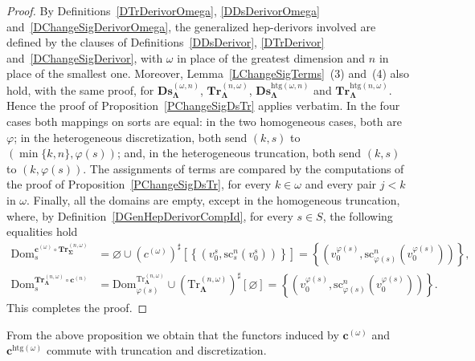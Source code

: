 \documentclass[a4paper, reqno]{amsbook}
\newcommand{\sig}[1]{\mathbf{#1}}             %
\newcommand{\Dom}{\mathrm{Dom}}
\newcommand{\htg}{\mathrm{htg}}                %
\newcommand{\src}{\mathrm{sc}}
\newcommand{\Tr}{\mathrm{Tr}}
\newcommand{\bDs}{\mathbf{Ds}}
\newcommand{\bTr}{\mathbf{Tr}}
\theoremstyle{plain}
\theoremstyle{definition}
\begin{document}
\begin{proof}
By Definitions~\ref{DTrDerivorOmega}, \ref{DDsDerivorOmega} and~\ref{DChangeSigDerivorOmega}, the generalized hep-derivors involved are defined by the clauses of Definitions~\ref{DDsDerivor}, \ref{DTrDerivor} and~\ref{DChangeSigDerivor}, with $\omega$ in place of the greatest dimension and $n$ in place of the smallest one.
Moreover, Lemma~\ref{LChangeSigTerms}~(3) and~(4) also hold, with the same proof, for $\bDs^{(\omega,n)}_{\sig{\Lambda}}$, $\bTr^{(n,\omega)}_{\sig{\Lambda}}$, $\bDs^{\htg(\omega,n)}_{\sig{\Lambda}}$ and $\bTr^{\htg(n,\omega)}_{\sig{\Lambda}}$.
Hence the proof of Proposition~\ref{PChangeSigDsTr} applies verbatim.
In the four cases both mappings on sorts are equal: in the two homogeneous cases, both are $\varphi$; in the heterogeneous discretization, both send $(k,s)$ to $(\min\{k,n\},\varphi(s))$; and, in the heterogeneous truncation, both send $(k,s)$ to $(k,\varphi(s))$.
The assignments of terms are compared by the computations of the proof of Proposition~\ref{PChangeSigDsTr}, for every $k\in\omega$ and every pair $j<k$ in $\omega$.
Finally, all the domains are empty, except in the homogeneous truncation, where, by Definition~\ref{DGenHepDerivorCompId}, for every $s\in S$, the following equalities hold
\begin{align*}
\Dom^{\mathbf{c}^{(\omega)}\circ\bTr^{(n,\omega)}_{\sig{\Sigma}}}_{s}
&=
\varnothing\cup(c^{(\omega)})^{\sharp}\left[\left\lbrace\left(v^{s}_{0},\src^{n}_{s}(v^{s}_{0})\right)\right\rbrace\right]
=
\left\lbrace\left(v^{\varphi(s)}_{0},\src^{n}_{\varphi(s)}(v^{\varphi(s)}_{0})\right)\right\rbrace,
\\
\Dom^{\bTr^{(n,\omega)}_{\sig{\Lambda}}\circ\mathbf{c}^{(n)}}_{s}
&=
\Dom^{\Tr^{(n,\omega)}_{\sig{\Lambda}}}_{\varphi(s)}\cup(\Tr^{(n,\omega)}_{\sig{\Lambda}})^{\sharp}[\varnothing]
=
\left\lbrace\left(v^{\varphi(s)}_{0},\src^{n}_{\varphi(s)}(v^{\varphi(s)}_{0})\right)\right\rbrace.
\end{align*}
This completes the proof.
\end{proof}

From the above proposition we obtain that the functors induced by $\mathbf{c}^{(\omega)}$ and $\mathbf{c}^{\htg(\omega)}$ commute with truncation and discretization.
\end{document}
